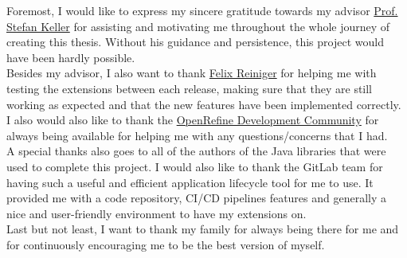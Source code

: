 Foremost, I would like to express my sincere gratitude towards my advisor \href{mailto:stefan.keller@ost.ch}{Prof. Stefan Keller}
for assisting and motivating me throughout the whole journey of creating this thesis.
Without his guidance and persistence, this project would have been hardly possible.\\
\newline
Besides my advisor, I also want to thank \href{mailto:felix.reiniger@ost.ch}{Felix Reiniger} for helping me with testing the extensions between each release, making sure
that they are still working as expected and that the new features have been implemented correctly.\\
\newline
I also would also like to thank the \href{https://groups.google.com/g/openrefine-dev}{OpenRefine Development Community} for always being available for helping me with any questions/concerns that I had.\\
\newline
A special thanks also goes to all of the authors of the Java libraries that were used to complete this project. I would also like to thank the GitLab team for having such a useful and efficient application lifecycle tool for me to use. It provided me with a code repository, CI/CD pipelines features and generally a nice and user-friendly environment to have my extensions on.\\
\newline
Last but not least, I want to thank my family for always being there for me and for continuously encouraging me to be the best version of myself.
